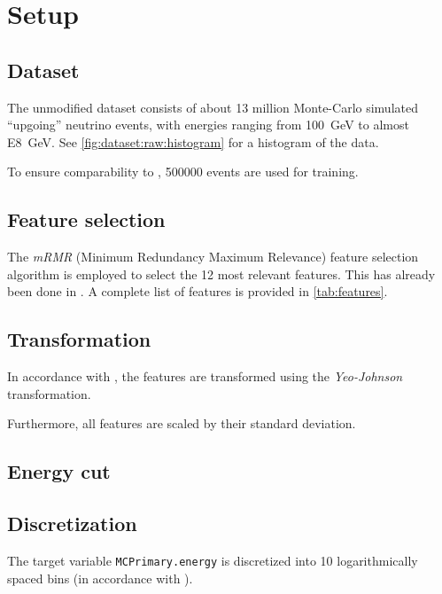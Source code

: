\section{Setup}

\subsection{Dataset}
The unmodified dataset consists of about 13 million Monte-Carlo simulated \enquote{upgoing} neutrino events,
with energies ranging from \SI{100}{\giga\electronvolt} to almost \SI{E8}{\giga\electronvolt}.
See \autoref{fig:dataset:raw:histogram} for a histogram of the data.

To ensure comparability to \cite{dsea_samuel},
\num{500000} events are used for training.


\subsection{Feature selection}
The \emph{mRMR} (Minimum Redundancy Maximum Relevance) feature selection algorithm is employed to select the 12 most relevant features.
This has already been done in \cite{dsea_jan}.
A complete list of features is provided in \autoref{tab:features}.


\subsection{Transformation}
In accordance with \cite{dsea_jan},
the features are transformed using the \emph{Yeo-Johnson} transformation.

Furthermore, all features are scaled by their standard deviation.


\subsection{Energy cut}

\subsection{Discretization}
The target variable \texttt{MCPrimary.energy} is discretized into \num{10} logarithmically spaced bins
(in accordance with \cite{dsea_samuel}).

